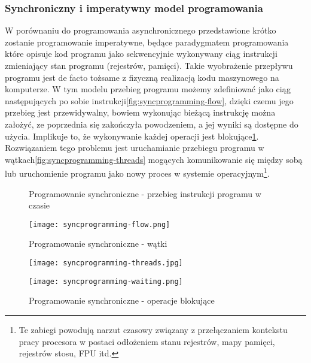 \subsubsection{Synchroniczny i imperatywny model programowania}

W porównaniu do programowania asynchronicznego przedstawione krótko zostanie programowanie imperatywne, będące paradygmatem programowania\cite{programming-paradigms} które opisuje kod programu jako sekwencyjnie wykonywany ciąg instrukcji zmieniający stan programu (rejestrów, pamięci). Takie wyobrażenie przepływu programu jest de facto tożsame z fizyczną realizacją kodu maszynowego na komputerze. W tym modelu przebieg programu możemy zdefiniować jako ciąg następujących po sobie instrukcji\ref{fig:syncprogramming-flow}, dzięki czemu jego przebieg jest przewidywalny, bowiem wykonując bieżącą instrukcję można założyć, ze poprzednia się zakończyła powodzeniem, a jej wyniki są dostępne do użycia. Implikuje to, że wykonywanie każdej operacji jest blokujące\ref{fig:syncprogramming-waiting}. Rozwiązaniem tego problemu jest uruchamianie przebiegu programu w wątkach\ref{fig:syncprogramming-threads} mogących komunikowanie się między sobą lub uruchomienie programu jako nowy proces w systemie operacyjnym\footnote{Te zabiegi powodują narzut czasowy związany z przełączaniem kontekstu pracy procesora w postaci odłożeniem stanu rejestrów, mapy pamięci, rejestrów stosu, FPU itd.}.

\begin{figure}[ht]
\centering
\begin{minipage}[b]{0.45\linewidth}
  \label{fig:syncprogramming-flow}
  \caption[Programowanie synchroniczne - przebieg instrukcji programu w czasie]{Programowanie synchroniczne - przebieg instrukcji programu w czasie}
  \centering
    \texttt{[image: syncprogramming-flow.png]}
\end{minipage}

\begin{minipage}[b]{0.45\linewidth}
\label{fig:syncprogramming-threads}
  \caption[Programowanie synchroniczne - wątki]{Programowanie synchroniczne - wątki}
  \centering
    \texttt{[image: syncprogramming-threads.jpg]}
\end{minipage}

\begin{minipage}[b]{0.45\linewidth}
\label{fig:syncprogramming-waiting}
  \caption[Programowanie synchroniczne - operacje blokujące]{Programowanie synchroniczne - operacje blokujące}
  \centering
    \texttt{[image: syncprogramming-waiting.png]}
\end{minipage}
\end{figure}

